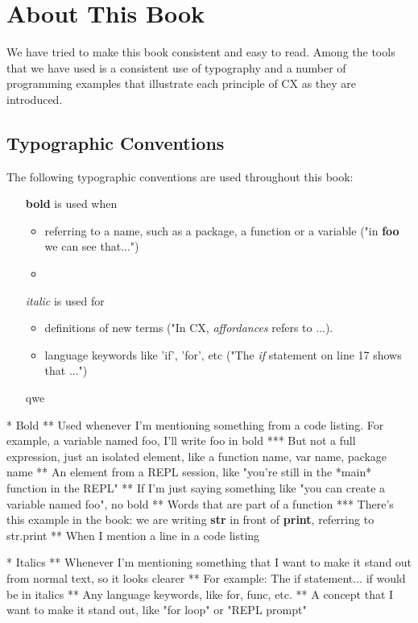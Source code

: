 \documentclass[11pt,fleqn,openany]{book} %
\begin{document}
\section{About This Book}
\label{chapter:about-this-book}

We have tried to make this book consistent and easy to read. Among the tools that we have used is a consistent use of typography and a number of programming examples that illustrate each principle of CX as they are introduced.

\subsection{Typographic Conventions}

The following typographic conventions are used throughout this book:
\begin{itemize}
    \item[\textbf{bold}] is used when 
    \begin{itemize}
        \item referring to a name, such as a package, a function or a variable ("in \textbf{foo} we can see that...")
        \item
    \end{itemize}
    \item[\textit{italic}] is used for
    \begin{itemize}
        \item definitions of new terms ("In CX, \textit{affordances} refers to ...).
        \item language keywords like 'if', 'for', etc ("The \textit{if} statement on line 17 shows that ...")
    \end{itemize}
    \item[qwe]
\end{itemize}
* Bold
** Used whenever I'm mentioning something from a code listing. For example, a variable named foo, I'll write foo in bold
*** But not a full expression, just an isolated element, like a function name, var name, package name
** An element from a REPL session, like "you're still in the *main* function in the REPL"
** If I'm just saying something like "you can create a variable named foo", no bold
** Words that are part of a function
*** There's this example in the book:  we are writing \textbf{str} in front of \textbf{print}, referring to str.print
** When I mention a line in a code listing

* Italics
** Whenever I'm mentioning something that I want to make it stand out from normal text, so it looks clearer
** For example: The if statement... if would be in italics
** Any language keywords, like for, func, etc.
** A concept that I want to make it stand out, like "for loop" or "REPL prompt"
\end{document}
